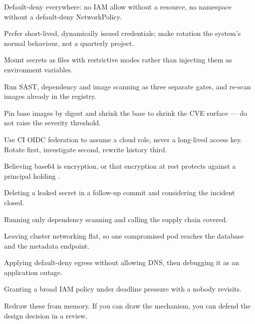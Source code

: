 \begin{bestpractices}
\begin{wbitem}
  \item Default-deny everywhere: no IAM allow without a resource, no namespace without a default-deny NetworkPolicy.
  \item Prefer short-lived, dynamically issued credentials; make rotation the system's normal behaviour, not a quarterly project.
  \item Mount secrets as files with restrictive modes rather than injecting them as environment variables.
  \item Run SAST, dependency and image scanning as three separate gates, and re-scan images already in the registry.
  \item Pin base images by digest and shrink the base to shrink the CVE surface --- do not raise the severity threshold.
  \item Use CI OIDC federation to assume a cloud role, never a long-lived access key. Rotate first, investigate second, rewrite history third.
\end{wbitem}
\end{bestpractices}
\begin{mistakes}
\begin{wbitem}
  \item Believing base64 is encryption, or that encryption at rest protects against a principal holding .
  \item Deleting a leaked secret in a follow-up commit and considering the incident closed.
  \item Running only dependency scanning and calling the supply chain covered.
  \item Leaving cluster networking flat, so one compromised pod reaches the database and the metadata endpoint.
  \item Applying default-deny egress without allowing DNS, then debugging it as an application outage.
  \item Granting a broad IAM policy under deadline pressure with a  nobody revisits.
\end{wbitem}
\end{mistakes}


Redraw these from memory. If you can draw the mechanism, you can defend the design decision in a review.

